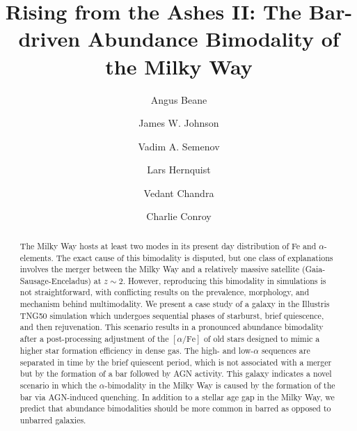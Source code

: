 \documentclass[twocolumn]{aastex631}
\newcommand{\alphaFe}{\ensuremath{[\alpha/\textrm{Fe}]}}
\begin{document}
\title{Rising from the Ashes II: The Bar-driven Abundance Bimodality of the Milky Way}

\author{Angus Beane}

\author{James W. Johnson}

\author{Vadim A. Semenov}

\author{Lars Hernquist}

\author{Vedant Chandra}

\author{Charlie Conroy}

\begin{abstract}
    The Milky Way hosts at least two modes in its present day distribution of Fe and $\alpha$-elements. The exact cause of this bimodality is disputed, but one class of explanations involves the merger between the Milky Way and a relatively massive satellite (Gaia-Sausage-Enceladus) at $z\sim2$. However, reproducing this bimodality in simulations is not straightforward, with conflicting results on the prevalence, morphology, and mechanism behind multimodality. We present a case study of a galaxy in the Illustris TNG50 simulation which undergoes sequential phases of starburst, brief quiescence, and then rejuvenation. This scenario results in a pronounced abundance bimodality after a post-processing adjustment of the \alphaFe{} of old stars designed to mimic a higher star formation efficiency in dense gas. The high- and low-$\alpha$ sequences are separated in time by the brief quiescent period, which is not associated with a merger but by the formation of a bar followed by AGN activity. This galaxy indicates a novel scenario in which the $\alpha$-bimodality in the Milky Way is caused by the formation of the bar via AGN-induced quenching. In addition to a stellar age gap in the Milky Way, we predict that abundance bimodalities should be more common in barred as opposed to unbarred galaxies.
  \end{abstract}
    
\end{document}
